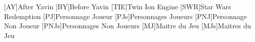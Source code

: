 [AY]{After Yavin}
[BY]{Before Yavin}
[TIE]{Twin Ion Engine}
[SWR]{Star Wars Redemption}
[PJ]{Personnage Joueur}
[PJs]{Personnages Joueurs}
[PNJ]{Personnage Non Joueur}
[PNJs]{Personnages Non Joueurs}
[MJ]{Maitre du Jeu}                                                                        
[MJs]{Maitres du Jeu}
